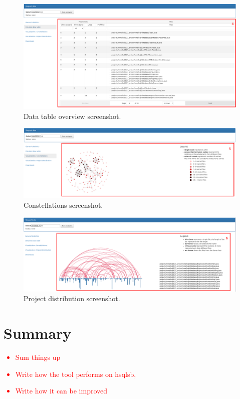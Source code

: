 \documentclass{uva-inf-article}
\newcommand\todo[1]{\textcolor{red}{#1}}
\begin{document}
\begin{figure}[!htb]
	\includegraphics[width=\textwidth]{visualization2}
	\centering
	\caption{Data table overview screenshot.}
	\label{screenshot2}
\end{figure}

\begin{figure}[!htb]
	\includegraphics[width=\textwidth]{visualization3}
	\centering
	\caption{Constellations screenshot.}
	\label{screenshot3}
\end{figure}

\begin{figure}[!htb]
	\includegraphics[width=\textwidth]{visualization4}
	\centering
	\caption{Project distribution screenshot.}
	\label{screenshot4}
\end{figure}

\section{Summary}
\todo {
	\begin{itemize}
		\item{Sum things up}
		\item{Write how the tool performs on hsqlsb,}
		\item{Write how it can be improved}
	\end{itemize}
}
\end{document}
